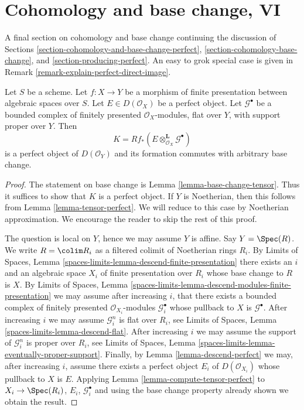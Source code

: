 \section{Cohomology and base change, VI}
\label{section-cohomology-and-base-change-final}

\noindent
A final section on cohomology and base change continuing
the discussion of Sections
\ref{section-cohomology-and-base-change-perfect},
\ref{section-cohomology-base-change}, and
\ref{section-producing-perfect}.
An easy to grok special case is given in
Remark \ref{remark-explain-perfect-direct-image}.

\begin{lemma}
\label{lemma-base-change-tensor-perfect}
Let $S$ be a scheme. Let $f : X \to Y$ be a morphism of finite presentation
between algebraic spaces over $S$. Let $E \in D(\mathcal{O}_X)$ be a perfect
object. Let $\mathcal{G}^\bullet$ be a bounded complex of finitely presented
$\mathcal{O}_X$-modules, flat over $Y$, with support proper over $Y$. Then
$$
K = Rf_*(E \otimes_{\mathcal{O}_X}^\mathbf{L} \mathcal{G}^\bullet)
$$
is a perfect object of $D(\mathcal{O}_Y)$ and its formation
commutes with arbitrary base change.
\end{lemma}

\begin{proof}
The statement on base change is Lemma \ref{lemma-base-change-tensor}.
Thus it suffices to show that $K$ is a perfect object. If $Y$ is
Noetherian, then this follows from
Lemma \ref{lemma-tensor-perfect}.
We will reduce to this case by Noetherian approximation.
We encourage the reader to skip the rest of this proof.

\medskip\noindent
The question is local on $Y$, hence we may assume $Y$ is affine.
Say $Y = \Spec(R)$. We write $R = \colim R_i$ as a filtered colimit
of Noetherian rings $R_i$. By Limits of Spaces, Lemma
\ref{spaces-limits-lemma-descend-finite-presentation}
there exists an $i$ and an algebraic space $X_i$ of finite presentation
over $R_i$ whose base change to $R$ is $X$. By
Limits of Spaces, Lemma
\ref{spaces-limits-lemma-descend-modules-finite-presentation}
we may assume after increasing $i$, that there exists a
bounded complex of finitely
presented $\mathcal{O}_{X_i}$-modules $\mathcal{G}_i^\bullet$ whose
pullback to $X$ is $\mathcal{G}^\bullet$. After increasing $i$
we may assume $\mathcal{G}_i^n$ is flat over $R_i$, see
Limits of Spaces, Lemma
\ref{spaces-limits-lemma-descend-flat}.
After increasing $i$ we may assume the support of $\mathcal{G}_i^n$
is proper over $R_i$, see
Limits of Spaces, Lemma \ref{spaces-limits-lemma-eventually-proper-support}.
Finally, by Lemma \ref{lemma-descend-perfect}
we may, after increasing $i$, assume there exists a perfect
object $E_i$ of $D(\mathcal{O}_{X_i})$ whose pullback to
$X$ is $E$. Applying Lemma \ref{lemma-compute-tensor-perfect}
to $X_i \to \Spec(R_i)$, $E_i$, $\mathcal{G}_i^\bullet$ and using the
base change property already shown we obtain the result.
\end{proof}

